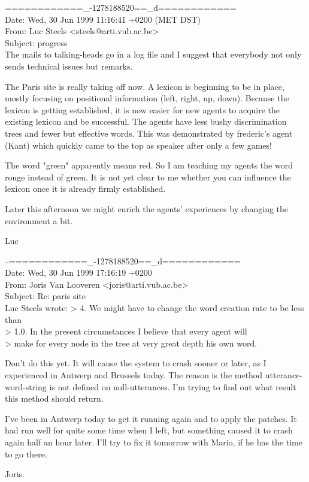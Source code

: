 \begin{mail}
============\_-1278188520==\_d============\\
Date: Wed, 30 Jun 1999 11:16:41 +0200 (MET DST)\\
From: Luc Steels <steels@arti.vub.ac.be>\\
Subject: progress \\

The mails to talking-heads go in a log file and I suggest that everybody not 
only sends technical issues but remarks.

The Paris site is really taking off now. A lexicon is beginning to 
be in place, mostly focusing on positional information (left, right, up, 
down). Because the lexicon is getting established, it is now easier for
new agents to acquire the existing lexicon and be successful. The agents have less
bushy discrimination trees and fewer but effective words. This was demonstrated
by frederic's agent (Kant) which quickly came to the top as speaker after only a
few games!

The word "green" apparently means red. So I am teaching my agents the word
rouge instead of green. It is not yet clear to me whether you can influence 
the lexicon once it is already firmly established.

Later this afternoon we might enrich the agents' experiences by changing the
environment a bit.

Luc
\end{mail}
\newpage
\begin{mail}
--============\_-1278188520==\_d============\\
Date: Wed, 30 Jun 1999 17:16:19 +0200\\
From: Joris Van Looveren <joris@arti.vub.ac.be>\\
Subject: Re: paris site\\

Luc Steels wrote:
> 4. We might have to change the word creation rate to be less than 
\\> 1.0. In the present circumstances I believe that every agent will 
\\> make for every node in the tree at very great depth his own word.

Don't do this yet. It will cause the system to crash sooner or later, as
I experienced in Antwerp and Brussels today. The reason is the method
utterance-word-string is not defined on null-utterances. I'm trying to
find out what result this method should return.

I've been in Antwerp today to get it running again and to apply the
patches. It had run well for quite some time when I left, but something
caused it to crash again half an hour later. I'll try to fix it tomorrow
with Mario, if he has the time to go there.

Joris.
\end{mail}


